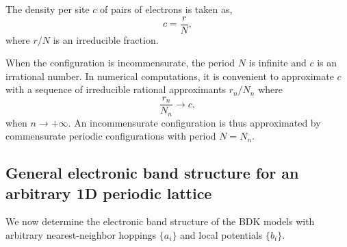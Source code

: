 \documentclass[]{revtex4-1}
\begin{document}
The density per site $c$ of pairs of electrons is taken as,
 \begin{equation}
 \label{density}
 c= \frac{r}{N},
 \end{equation}
 where $r/N$ is an irreducible fraction.

When the configuration is incommensurate, the period $N$ is infinite and $c$ is an irrational number. 
In numerical computations, it is convenient to approximate $c$ with a sequence of irreducible rational approximants $r_n/N_n$ where
 \begin{equation}
 \frac{r_n}{N_n} \rightarrow c, \label{rationalapproximants}
 \end{equation}
when $n \rightarrow +\infty$.
 An incommensurate configuration is thus approximated by commensurate periodic configurations with period $N=N_n$. 

\subsection{General electronic band structure for an arbitrary 1D periodic lattice} \label{generalelectronic}

We now determine the electronic band structure of the BDK models with arbitrary nearest-neighbor hoppings $\{a_i\}$ and local potentials $\{b_i\}$.
\end{document}
